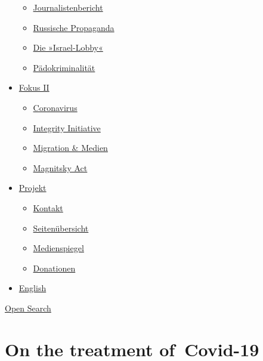 \begin{itemize}
  \begin{itemize}
  \tightlist
  \item
    \href{https://swprs.org/bericht-eines-journalisten/}{Journalistenbericht}
  \item
    \href{https://swprs.org/russische-propaganda/}{Russische Propaganda}
  \item
    \href{https://swprs.org/die-israel-lobby-fakten-und-mythen/}{Die
    »Israel-Lobby«}
  \item
    \href{https://swprs.org/geopolitik-und-paedokriminalitaet/}{Pädokriminalität}
  \end{itemize}
\item
  \href{https://swprs.org/migration-und-medien/}{Fokus II}

  \begin{itemize}
  \tightlist
  \item
    \href{https://swprs.org/covid-19-hinweis-ii/}{Coronavirus}
  \item
    \href{https://swprs.org/die-integrity-initiative/}{Integrity
    Initiative}
  \item
    \href{https://swprs.org/migration-und-medien/}{Migration \& Medien}
  \item
    \href{https://swprs.org/der-fall-magnitsky/}{Magnitsky Act}
  \end{itemize}
\item
  \href{https://swprs.org/kontakt/}{Projekt}

  \begin{itemize}
  \tightlist
  \item
    \href{https://swprs.org/kontakt/}{Kontakt}
  \item
    \href{https://swprs.org/uebersicht/}{Seitenübersicht}
  \item
    \href{https://swprs.org/medienspiegel/}{Medienspiegel}
  \item
    \href{https://swprs.org/donationen/}{Donationen}
  \end{itemize}
\item
  \href{https://swprs.org/contact/}{English}
\end{itemize}

\protect\hyperlink{}{Open Search}

\hypertarget{on-the-treatment-of-covid-19}{%
\section{On the treatment
of~Covid-19}\label{on-the-treatment-of-covid-19}}

